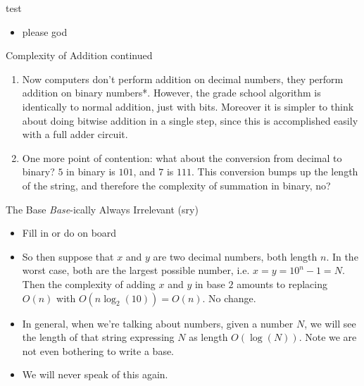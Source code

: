\documentclass{beamer}
\begin{document}
\begin{frame}{test}
    \begin{itemize}
        \item please god
    \end{itemize}
\end{frame}

\begin{frame}{Complexity of Addition continued}
    \begin{enumerate}
        \item Now computers don't perform addition on decimal numbers, they perform addition on binary numbers*. However, the grade school algorithm is identically to normal addition, just with bits. Moreover it is simpler to think about doing bitwise addition in a single step, since this is accomplished easily with a full adder circuit. 
        \item One more point of contention: what about the conversion from decimal to binary? $5$ in binary is $101$, and $7$ is $111$. This conversion bumps up the length of the string, and therefore the complexity of summation in binary, no?
    \end{enumerate}
\end{frame}

\begin{frame}{The Base \emph{Base}-ically Always Irrelevant (sry)}
    \begin{itemize}
        \item Fill in or do on board
        \item So then suppose that $x$ and $y$ are two decimal numbers, both length $n$. In the worst case, both are the largest possible number, i.e. $x = y = 10^n-1 = N$. Then the complexity of adding $x$ and $y$ in base $2$ amounts to replacing $O(n)$ with $O(n\log_2(10)) = O(n)$. No change. 
        \item In general, when we're talking about numbers, given a number $N$, we will see the length of that string expressing $N$ as length $O(\log(N))$. Note we are not even bothering to write a base. 
        \item We will never speak of this again. 
    \end{itemize}    
\end{frame}
\end{document}
